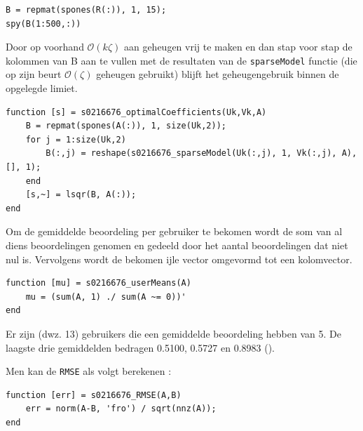 \begin{lstlisting}
B = repmat(spones(R(:)), 1, 15);
spy(B(1:500,:))
\end{lstlisting}



Door op voorhand $\mathcal{O}(k\zeta)$ aan geheugen vrij te maken en dan stap voor stap de kolommen van B aan te vullen met de resultaten van de \texttt{sparseModel} functie (die op zijn beurt $\mathcal{O}(\zeta)$ geheugen gebruikt) blijft het geheugengebruik binnen de opgelegde limiet.

\begin{lstlisting}
function [s] = s0216676_optimalCoefficients(Uk,Vk,A)
    B = repmat(spones(A(:)), 1, size(Uk,2));
    for j = 1:size(Uk,2)
        B(:,j) = reshape(s0216676_sparseModel(Uk(:,j), 1, Vk(:,j), A), [], 1);
    end
    [s,~] = lsqr(B, A(:));
end
\end{lstlisting}



Om de gemiddelde beoordeling per gebruiker te bekomen wordt de som van al diens beoordelingen genomen en gedeeld door het aantal beoordelingen dat niet nul is. Vervolgens wordt de bekomen ijle vector omgevormd tot een kolomvector.

\begin{lstlisting}
function [mu] = s0216676_userMeans(A)
    mu = (sum(A, 1) ./ sum(A ~= 0))'
end
\end{lstlisting}



Er zijn  (dwz. 13) gebruikers die een gemiddelde beoordeling hebben van 5. De laagste drie gemiddelden bedragen 0.5100, 0.5727 en 0.8983 ().



Men kan de \texttt{RMSE} als volgt berekenen :

\begin{lstlisting}
function [err] = s0216676_RMSE(A,B)
    err = norm(A-B, 'fro') / sqrt(nnz(A));
end
\end{lstlisting}



